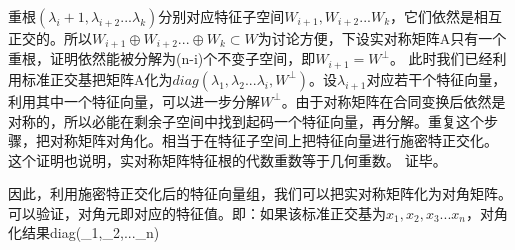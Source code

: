 重根$(\lambda_i+1,\lambda_{i+2}...\lambda_k)$分别对应特征子空间$W_{i+1},W_{i+2}...W_k$，它们依然是相互正交的。所以$W_{i+1}\oplus W_{i+2}...\oplus W_k\subset W$为讨论方便，下设实对称矩阵A只有一个重根，证明依然能被分解为(n-i)个不变子空间，即$W_{i+1}=W^{\perp}$。
此时我们已经利用标准正交基把矩阵A化为$diag(\lambda_1,\lambda_2...\lambda_i,W^{\perp})$。设$\lambda_{i+1}$对应若干个特征向量，利用其中一个特征向量，可以进一步分解$W^{\perp}$。由于对称矩阵在合同变换后依然是对称的，所以必能在剩余子空间中找到起码一个特征向量，再分解。重复这个步骤，把对称矩阵对角化。相当于在特征子空间上把特征向量进行施密特正交化。
这个证明也说明，实对称矩阵特征根的代数重数等于几何重数。
证毕。

因此，利用施密特正交化后的特征向量组，我们可以把实对称矩阵化为对角矩阵。可以验证，对角元即对应的特征值。即：如果该标准正交基为${x_1,x_2,x_3...x_n}$，对角化结果diag(\lambda_1,\lambda_2,...\lambda_n)
